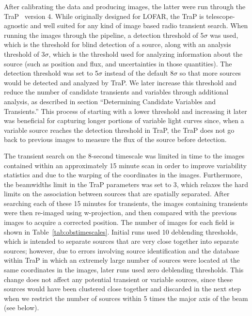 \documentclass[12pt]{article}
\begin{document}
After calibrating the data and producing images, the latter were run through the TraP~\citep{2015A&C....11...25S} version 4. While originally designed for LOFAR, the TraP is telescope-agnostic and well suited for any kind of image based radio transient search. When running the images through the pipeline, a detection threshold of 5$\sigma$ was used, which is the threshold for blind detection of a source, along with an analysis threshold of $3\sigma$, which is the threshold used for analyzing information about the source (such as position and flux, and uncertainties in those quantities). The detection threshold was set to 5$\sigma$ instead of the default 8$\sigma$ so that more sources would be detected and analyzed by TraP. We later increase this threshold and reduce the number of candidate transients and variables through additional analysis, as described in section ``Determining Candidate Variables and Transients.'' This process of starting with a lower threshold and increasing it later was beneficial for capturing longer portions of variable light curves since, when a variable source reaches the detection threshold in TraP, the TraP does not go back to previous images to measure the flux of the source before detection. 

The transient search on the 8-second timescale was limited in time to the images contained within an approximately 15 minute scan in order to improve variability statistics and due to the warping of the coordinates in the images. Furthermore, the beamwidths limit in the TraP parameters was set to 3, which relaxes the hard limits on the association between sources that are spatially separated. After searching each of these 15 minutes for transients, the images containing transients were then re-imaged using w-projection, and then compared with the previous images to acquire a corrected position. The number of images for each field is shown in Table~\ref{tab:obstimescales}. Initial runs used 10 deblending thresholds, which is intended to separate sources that are very close together into separate sources; however, due to errors involving source identification and the database within TraP in which an extremely large number of sources were located at the same coordinates in the images, later runs used zero deblending thresholds. This change does not affect any potential transient or variable sources, since these sources would have been clustered close together and discarded in the next step when we restrict the number of sources within 5 times the major axis of the beam (see below).
\end{document}
